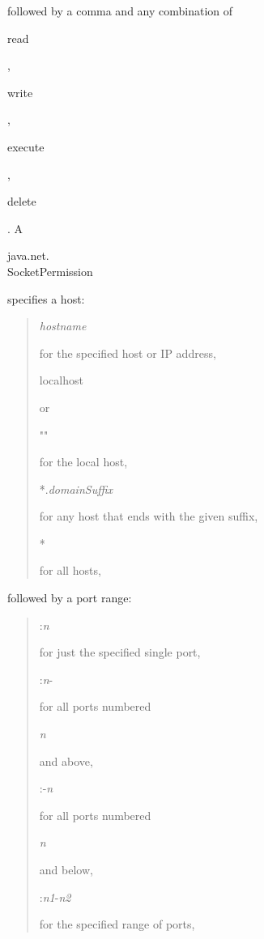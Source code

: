 followed by a comma and any combination of \begin{code}read\end{code},
\begin{code}write\end{code}, \begin{code}execute\end{code}, \begin{code}delete\end{code}.
A \begin{code}java.net.\\SocketPermission\end{code} specifies a host:
\begin{quote}
  \begin{code}\emph{hostname}\end{code} for the specified host or IP address, \\
  \begin{code}localhost\end{code} or \begin{code}""\end{code} for the local host, \\
  \begin{code}*.\emph{domainSuffix}\end{code} for any host that ends with the given suffix, \\
  \begin{code}*\end{code} for all hosts,
\end{quote}
followed by a port range:
\begin{quote}
  \begin{code}:\emph{n}\end{code} for just the specified single port, \\
  \begin{code}:\emph{n}-\end{code} for all ports numbered \begin{code}\emph{n}\end{code}
  and above, \\
  \begin{code}:-\emph{n}\end{code} for all ports numbered \begin{code}\emph{n}\end{code}
  and below, \\
  \begin{code}:\emph{n1}-\emph{n2}\end{code} for the specified range of ports,
\end{quote}
